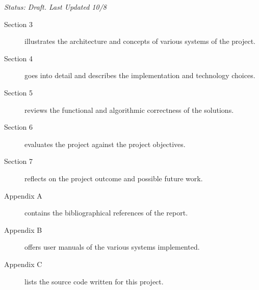\emph{Status: Draft. Last Updated 10/8}

\begin{description}
    \item[Section 3] illustrates the architecture and concepts of various systems of the project.
    \item[Section 4] goes into detail and describes the implementation and technology choices.
    \item[Section 5] reviews the functional and algorithmic correctness of the solutions.
    \item[Section 6] evaluates the project against the project objectives.
    \item[Section 7] reflects on the project outcome and possible future work.
    \item[Appendix A] contains the bibliographical references of the report.
    \item[Appendix B] offers user manuals of the various systems implemented.
    \item[Appendix C] lists the source code written for this project.
\end{description}